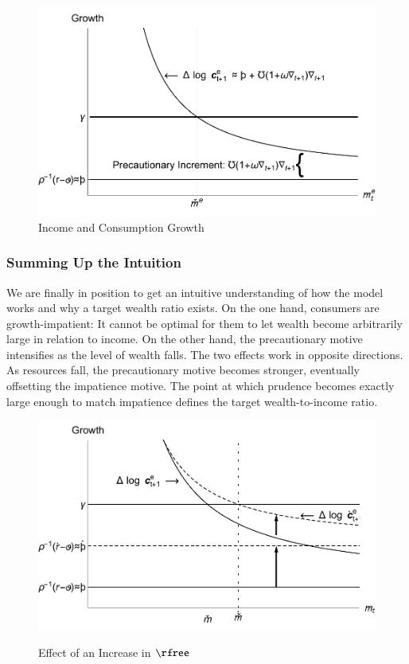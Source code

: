 \documentclass[titlepage,abstract]{\econtex}\newcommand{\texname}{ctDiscrete}
\begin{document}
\begin{figure}
\caption{Income and Consumption Growth}\label{fig:GrowthA}
\includegraphics{./Figures/TractableBufferStockGrowthA}
\end{figure}

\subsubsection{Summing Up the Intuition}
We are finally in position to get an intuitive understanding of how
the model works and why a target wealth ratio exists.  On the one
hand, consumers are growth-impatient: It cannot be optimal for them to
let wealth become arbitrarily large in relation to income.  On the
other hand, the precautionary motive intensifies as
the level of wealth falls. The two effects work in opposite
directions. As resources fall, the precautionary motive becomes
stronger, eventually offsetting the impatience motive. The point at
which prudence becomes exactly large enough to match impatience defines
the target wealth-to-income ratio.

\begin{figure}
\caption{Effect of an Increase in $\rfree$}
\includegraphics{./Figures/TractableBufferStockGrowthB}
\label{fig:GrowthB}
\end{figure}
\end{document}
